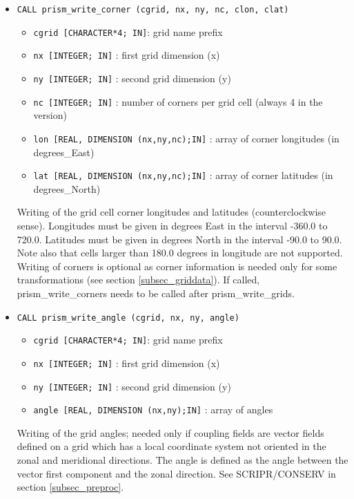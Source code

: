 \begin{itemize}
\item {\tt CALL prism\_write\_corner (cgrid, nx, ny, nc, clon, clat)}

 \begin{itemize}
    \item {\tt cgrid [CHARACTER*4; IN]}: grid name prefix
    \item {\tt nx [INTEGER; IN]} : first grid dimension (x)
    \item {\tt ny [INTEGER; IN]} : second grid dimension (y)
    \item {\tt nc [INTEGER; IN]} : number of corners per grid cell (always 4 in the version)
    \item {\tt lon [REAL, DIMENSION (nx,ny,nc);IN]} : array of corner
    longitudes (in degrees\_East)
    \item {\tt lat [REAL, DIMENSION (nx,ny,nc);IN]} : array of corner
    latitudes (in degrees\_North)
 \end{itemize}

 Writing of the grid cell corner longitudes and latitudes
 (counterclockwise sense). Longitudes must be given in degrees East in
 the interval -360.0 to 720.0. Latitudes must be given in degrees
 North in the interval -90.0 to 90.0. Note also that cells larger than
 180.0 degrees in longitude are not supported. Writing of corners is
 optional as corner information is needed only for some
 transformations (see section \ref{subsec_griddata}). If called,
 prism\_write\_corners needs to be called after prism\_write\_grids.

\item {\tt CALL prism\_write\_angle (cgrid, nx, ny, angle)}

 \begin{itemize}
    \item {\tt cgrid [CHARACTER*4; IN]}: grid name prefix
    \item {\tt nx [INTEGER; IN]} : first grid dimension (x)
    \item {\tt ny [INTEGER; IN]} : second grid dimension (y)
    \item {\tt angle [REAL, DIMENSION (nx,ny);IN]} : array of angles
 \end{itemize}

 Writing of the grid angles; needed only if coupling fields
 are vector fields defined on a grid which has a local coordinate system not oriented in 
 the zonal and meridional directions. The angle is defined as the angle between the vector
 first component and the zonal direction. See SCRIPR/CONSERV in section \ref{subsec_preproc}.


\end{itemize}
